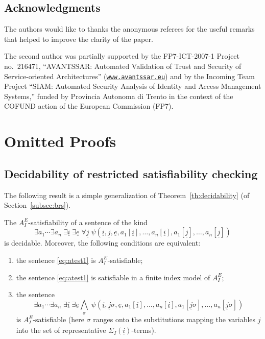 \documentclass{LMCS}
\newcommand{\ue}{\ensuremath{\underline e}}
\newcommand{\ui}{\ensuremath{\underline i}}
\newcommand{\uj}{\ensuremath{\underline j}}
\theoremstyle{plain}\newtheorem{assumption}[thm]{Assumption}
\theoremstyle{plain}\newtheorem{proposition}[thm]{Proposition}
\theoremstyle{plain}\newtheorem{property}[thm]{Property}
\theoremstyle{plain}\newtheorem{example}[thm]{Example}
\theoremstyle{plain}\newtheorem{claim}[thm]{Claim}
\theoremstyle{plain}\newtheorem{lemma}[thm]{Lemma}
\begin{document}
\subsection*{Acknowledgments} The authors would like to thanks the
anonymous referees for the useful remarks that helped to improve the
clarity of the paper.  

The second author was partially supported by the FP7-ICT-2007-1
Project no.\ 216471, ``AVANTSSAR: Automated Validation of Trust and
Security of Service-oriented Architectures''
(\texttt{\url{www.avantssar.eu}}) and by the Incoming Team
Project ``SIAM: Automated Security Analysis of Identity and Access
Management Systems,'' funded by Provincia Autonoma di Trento in the
context of the COFUND action of the European Commission (FP7).

  

\newpage

\appendix



\section{Omitted Proofs}
\label{app:proofs}


\subsection*{Decidability of restricted satisfiability checking}

The following result is a simple generalization of
Theorem~\ref{th:decidability} (of Section~\ref{subsec:brs}).

\begin{thm}
  \label{thm:pi01}
  The $A^E_I$-satisfiability of a sentence of the kind
  \begin{equation}\label{eq:atest1}
    \exists a_1\cdots\exists a_n \; \exists \ui\; \exists \ue\;\forall \uj \; \psi(\ui, \uj, \ue, a_1[\ui], \dots, a_n[\ui], a_1[\uj], \dots, a_n[\uj])
  \end{equation}
  is decidable. Moreover, the following conditions are equivalent:
  \begin{enumerate}[{\rm (i)}]
  \item\label{ite:pi01_1} the sentence \eqref{eq:atest1} is $A^E_I$-satisfiable;
  \item\label{ite:pi01_2} the sentence \eqref{eq:atest1} is satisfiable in a finite index model of $A^E_I$;
  \item\label{ite:pi01_3} the sentence 
    \begin{equation}\exists a_1\cdots\exists a_n \; \exists \ui\; \exists \ue \bigwedge_{\sigma}\; \psi(\ui, \uj\sigma, \ue, a_1[\ui], \dots, a_n[\ui], a_1[\uj\sigma], \dots, a_n[\uj\sigma])
    \end{equation} 
    is $A^E_I$-satisfiable (here $\sigma$ ranges onto the
    substitutions mapping the variables $\uj$ into the set of
    representative $\Sigma_I(\ui)$-terms).
\end{enumerate}
\end{thm}
\end{document}
